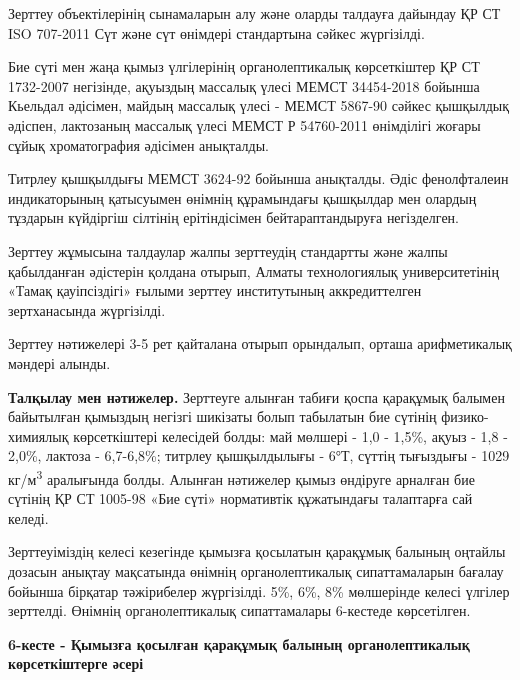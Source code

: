 Зерттеу объектілерінің сынамаларын алу және оларды талдауға дайындау ҚР
СТ ISO 707-2011 Сүт және сүт өнімдері стандартына сәйкес жүргізілді.

Бие сүті мен жаңа қымыз үлгілерінің органолептикалық көрсеткіштер ҚР СТ
1732-2007 негізінде, ақуыздың массалық үлесі МЕМСТ 34454-2018 бойынша
Кьельдал әдісімен, майдың массалық үлесі - МЕМСТ 5867-90 сәйкес
қышқылдық әдіспен, лактозаның массалық үлесі МЕМСТ Р 54760-2011
өнімділігі жоғары сұйық хроматография әдісімен анықталды.

Титрлеу қышқылдығы МЕМСТ 3624-92 бойынша анықталды. Әдіс фенолфталеин
индикаторының қатысуымен өнімнің құрамындағы қышқылдар мен олардың
тұздарын күйдіргіш сілтінің ерітіндісімен бейтараптандыруға негізделген.

Зерттеу жұмысына талдаулар жалпы зерттеудің стандартты және жалпы
қабылданған әдістерін қолдана отырып, Алматы технологиялық
университетінің «Тамақ қауіпсіздігі» ғылыми зерттеу институтының
аккредиттелген зертханасында жүргізілді.

Зерттеу нәтижелері 3-5 рет қайталана отырып орындалып, орташа
арифметикалық мәндері алынды.

{\bfseries Талқылау мен нәтижелер.} Зерттеуге алынған табиғи қоспа
қарақұмық балымен байытылған қымыздың негізгі шикізаты болып табылатын
бие сүтінің физико-химиялық көрсеткіштері келесідей болды: май мөлшері -
1,0 - 1,5\%, ақуыз - 1,8 - 2,0\%, лактоза - 6,7-6,8\%; титрлеу
қышқылдылығы - 6°Т, сүттің тығыздығы - 1029 кг/м\textsuperscript{3}
аралығында болды. Алынған нәтижелер қымыз өндіруге арналған бие сүтінің
ҚР СТ 1005-98 «Бие сүті» нормативтік құжатындағы талаптарға сай келеді.

Зерттеуіміздің келесі кезегінде қымызға қосылатын қарақұмық балының
оңтайлы дозасын анықтау мақсатында өнімнің органолептикалық
сипаттамаларын бағалау бойынша бірқатар тәжірибелер жүргізілді. 5\%,
6\%, 8\% мөлшерінде келесі үлгілер зерттелді. Өнімнің органолептикалық
сипаттамалары 6-кестеде көрсетілген.

{\bfseries 6-кесте - Қымызға қосылған қарақұмық балының органолептикалық
көрсеткіштерге әсері}

